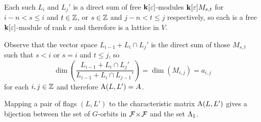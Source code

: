 \documentclass[a4paper, 11pt]{report}
\begin{document}
Each such $L_i$ and $L_j'$ is a direct sum of free $\mathbf{k}[\varepsilon]$-modules $\mathbf{k}[\varepsilon]M_{s,t}$ for $i-n<s\le i$ and $t\in\mathbb{Z}$, or $s\in\mathbb{Z}$ and $j-n<t\le j$ respectively, so each is a free $\mathbf{k}[\varepsilon]$-module of rank $r$ and therefore is a lattice in $V$.

Observe that the vector space $L_{i-1}+L_i\cap L_j'$ is the direct sum of those $M_{s,t}$ such that $s<i$ or $s=i$ and $t\le j$, so
\begin{equation*}
\dim\left(\frac{L_{i-1} + L_i\cap L_j'}{L_{i-1} + L_i\cap L_{j-1}'}\right) = \dim\left(M_{i,j}\right) = a_{i,j}
\end{equation*}
for each $i,j\in\mathbb{Z}$ and therefore $\operatorname{A}(L,L')=A$.

\begin{lemma}
Mapping a pair of flags $(L,L')$ to the characteristic matrix $\operatorname{A}(L,L')$ gives a bijection between the set of $G$-orbits in ${\mathcal{F}\!\times\!\mathcal{F}}$ and the set $\Lambda_1{}$.
\end{lemma}
\end{document}
